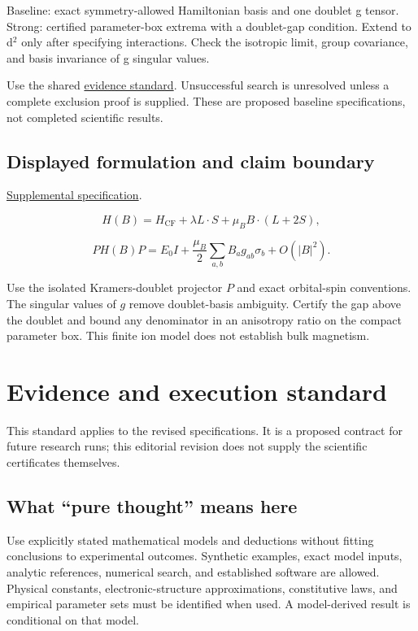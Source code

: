 \documentclass[
  11pt,
]{article}
\begin{document}
Baseline: exact symmetry-allowed Hamiltonian basis and one doublet g
tensor. Strong: certified parameter-box extrema with a doublet-gap
condition. Extend to d\ensuremath{{}^{2}} only after specifying
interactions. Check the isotropic limit, group covariance, and basis
invariance of g singular values.

Use the shared
\href{https://github.com/rick-stevens-ai/Pure-Thought/blob/main/reviews/EVIDENCE-STANDARD.md}{evidence
standard}. Unsuccessful search is unresolved unless a complete exclusion
proof is supplied. These are proposed baseline specifications, not
completed scientific results.

\subsection{Displayed formulation and claim boundary}

\href{https://github.com/rick-stevens-ai/Pure-Thought/blob/main/supplemental/S01.md}{Supplemental
specification}.

\[H(B)=H_{\mathrm{CF}}+\lambda L\cdot S+\mu_B B\cdot(L+2S),\]

\[P H(B)P=E_0I+\frac{\mu_B}{2}\sum_{a,b}B_a g_{ab}\sigma_b+O(|B|^2).\]

Use the isolated Kramers-doublet projector \(P\) and exact orbital-spin
conventions. The singular values of \(g\) remove doublet-basis
ambiguity. Certify the gap above the doublet and bound any denominator
in an anisotropy ratio on the compact parameter box. This finite ion
model does not establish bulk magnetism.

\section{Evidence and execution standard}

This standard applies to the revised specifications. It is a proposed
contract for future research runs; this editorial revision does not
supply the scientific certificates themselves.

\subsection{What ``pure thought'' means here}

Use explicitly stated mathematical models and deductions without fitting
conclusions to experimental outcomes. Synthetic examples, exact model
inputs, analytic references, numerical search, and established software
are allowed. Physical constants, electronic-structure approximations,
constitutive laws, and empirical parameter sets must be identified when
used. A model-derived result is conditional on that model.
\end{document}
